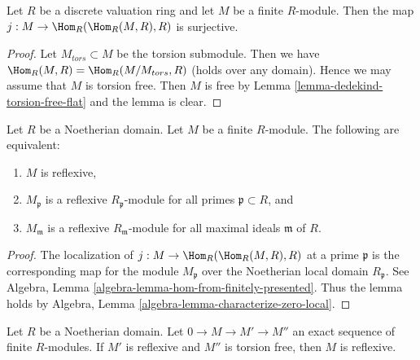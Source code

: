 \begin{lemma}
\label{lemma-cokernel-map-double-dual-dvr}
Let $R$ be a discrete valuation ring and let $M$ be a finite $R$-module.
Then the map $j : M \to \Hom_R(\Hom_R(M, R), R)$ is surjective.
\end{lemma}

\begin{proof}
Let $M_{tors} \subset M$ be the torsion submodule. Then we have
$\Hom_R(M, R) = \Hom_R(M/M_{tors}, R)$ (holds over any domain).
Hence we may assume that $M$ is torsion free. Then $M$ is free
by Lemma \ref{lemma-dedekind-torsion-free-flat} and the lemma is clear.
\end{proof}

\begin{lemma}
\label{lemma-check-reflexive}
Let $R$ be a Noetherian domain. Let $M$ be a finite $R$-module.
The following are equivalent:
\begin{enumerate}
\item $M$ is reflexive,
\item $M_\mathfrak p$ is a reflexive $R_\mathfrak p$-module
for all primes $\mathfrak p \subset R$, and
\item $M_\mathfrak m$ is a reflexive $R_\mathfrak m$-module
for all maximal ideals $\mathfrak m$ of $R$.
\end{enumerate}
\end{lemma}

\begin{proof}
The localization of $j : M \to \Hom_R(\Hom_R(M, R), R)$
at a prime $\mathfrak p$ is the corresponding map for the module
$M_\mathfrak p$ over the Noetherian local domain $R_\mathfrak p$.
See Algebra, Lemma \ref{algebra-lemma-hom-from-finitely-presented}.
Thus the lemma holds by
Algebra, Lemma \ref{algebra-lemma-characterize-zero-local}.
\end{proof}

\begin{lemma}
\label{lemma-sequence-reflexive}
Let $R$ be a Noetherian domain. Let $0 \to M \to M' \to M''$
an exact sequence of finite $R$-modules. If $M'$ is reflexive
and $M''$ is torsion free, then $M$ is reflexive.
\end{lemma}

